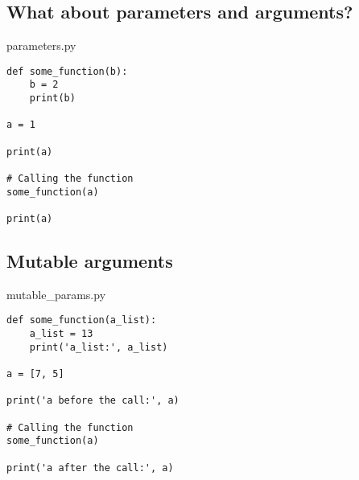 \documentclass[aspectratio=1610,slidestop]{beamer}
\begin{document}
\subsection{What about parameters and arguments?}
\begin{pframe}
 \begin{minipage}[t]{0.50\textwidth}
  \begin{pythonfile}{parameters.py}
   \begin{verbatim}
def some_function(b):
    b = 2
    print(b)

a = 1

print(a)

# Calling the function
some_function(a)

print(a)
   \end{verbatim}
  \end{pythonfile}
 \end{minipage}\qquad
 \pause
 \begin{minipage}[t]{0.45\textwidth}
 \vspace{-5.65cm}
 \begin{terminal}
  \end{terminal}
 \end{minipage}
\end{pframe}


\subsection{Mutable arguments}
\begin{pframe}
 \begin{minipage}[t]{0.50\textwidth}
  \begin{pythonfile}{mutable\_params.py}
   \begin{verbatim}
def some_function(a_list):
    a_list = 13
    print('a_list:', a_list)

a = [7, 5]

print('a before the call:', a)

# Calling the function
some_function(a)

print('a after the call:', a)
   \end{verbatim}
  \end{pythonfile}
 \end{minipage}\qquad
 \pause
 \begin{minipage}[t]{0.45\textwidth}
 \vspace{-5.65cm}
 \begin{terminal}
  \end{terminal}
 \end{minipage}
\end{pframe}
\end{document}
